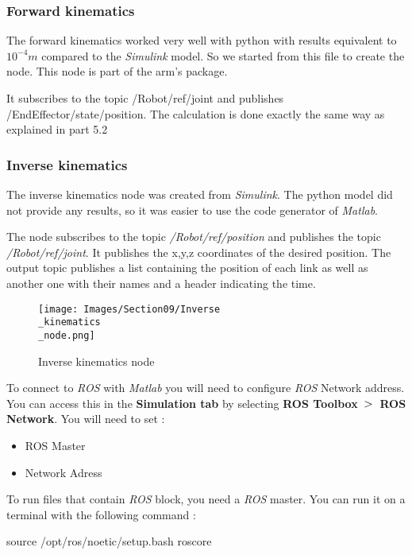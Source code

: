 \subsubsection{Forward kinematics}

The forward kinematics worked very well with python with results equivalent to $10^{-4}m$ compared to the \textit{Simulink} model. So we started from this file to create the node. This node is part of the arm's package. 

\bigbreak
It subscribes to the topic /Robot/ref/joint and publishes /EndEffector/state/position. The calculation is done exactly the same way as explained in part 5.2

\subsubsection{Inverse kinematics}

The inverse kinematics node was created from \textit{Simulink}. The python model did not provide any results, so it was easier to use the code generator of \textit{Matlab}.

\bigbreak
The node subscribes to the topic \textit{/Robot/ref/position} and publishes the topic \textit{/Robot/ref/joint}. It publishes the x,y,z coordinates of the desired position. The output topic publishes a list containing the position of each link as well as another one with their names and a header indicating the time.
\bigbreak
\begin{figure}[ht]
    \centering
    \texttt{[image: Images/Section09/Inverse\\\_kinematics\\\_node.png]}
    \caption{Inverse kinematics node}
    \label{fig:InverseKinNode}
\end{figure}
\FloatBarrier

\bigbreak
To connect to \textit{ROS} with \textit{Matlab} you will need to configure \textit{ROS} Network address. You can access this in the \textbf{Simulation tab} by selecting \textbf{ROS Toolbox} $\bg$ \textbf{ROS Network}. You will need to set :
\begin{multicols}{2}
    \begin{itemize}[noitemsep]
        \item ROS Master
        \item Network Adress
    \end{itemize}
\end{multicols}

\bigbreak
To run files that contain \textit{ROS} block, you need a \textit{ROS} master. You can run it on a terminal with the following command :
\begin{commandshell}
    source /opt/ros/noetic/setup.bash
    roscore
\end{commandshell} 

